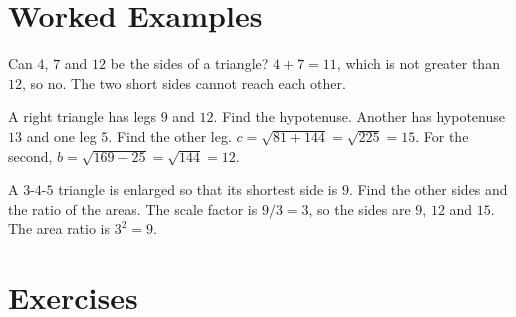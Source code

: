 \section{Worked Examples}

\begin{example}
Can $4$, $7$ and $12$ be the sides of a triangle?
\solution $4 + 7 = 11$, which is not greater than $12$, so no. The two short sides cannot reach each other.
\end{example}

\begin{example}
A right triangle has legs $9$ and $12$. Find the hypotenuse. Another has hypotenuse $13$ and one leg $5$. Find the other leg.
\solution $c = \sqrt{81 + 144} = \sqrt{225} = 15$. For the second, $b = \sqrt{169 - 25} = \sqrt{144} = 12$.
\end{example}

\begin{example}
A $3$-$4$-$5$ triangle is enlarged so that its shortest side is $9$. Find the other sides and the ratio of the areas.
\solution The scale factor is $9/3 = 3$, so the sides are $9$, $12$ and $15$. The area ratio is $3^2 = 9$.
\end{example}

\section{Exercises}

